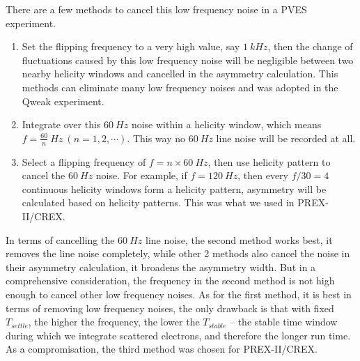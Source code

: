 There are a few methods to cancel this low frequency noise in a PVES experiment.
\begin{enumerate}
    \item Set the flipping frequency to a very high value, say $1\ kHz$, then
	the change of fluctuations caused by this low frequency noise will be negligible
	between two nearby helicity windows and cancelled in the asymmetry calculation. 
	This methods can eliminate many low frequency noises and was adopted in the Qweak experiment.
    \item Integrate over this $60\ Hz$ noise within a helicity window, which means
	$f = \frac{60}{n}\ Hz\ (n = 1, 2, \cdots)$. This way no $60\ Hz$ line noise
	will be recorded at all.
    \item Select a flipping frequency of $f = n \times 60 \ Hz$,
	then use helicity pattern to cancel the $60\ Hz$ noise. For example, 
	if $f = 120\ Hz$, then every $f/30 = 4$ continuous helicity windows form a 
	helicity pattern, asymmetry will be calculated based on helicity patterns. 
	This was what we used in PREX-II/CREX.
\end{enumerate}

In terms of cancelling the $60\ Hz$ line noise, the second method works best,
it removes the line noise completely, while other 2 methods also cancel the noise
in their asymmetry calculation, it broadens the asymmetry width. But in a comprehensive
consideration, the frequency in the second method is not high enough to cancel
other low frequency noises. As for the first method, it is best in terms of
removing low frequency noises, the only drawback is that with fixed $T_{settle}$,
the higher the frequency, the lower the $T_{stable}$ -- the stable time window
during which we integrate scattered electrons, and therefore the longer run time. 
As a compromisation, the third method was chosen for PREX-II/CREX.


